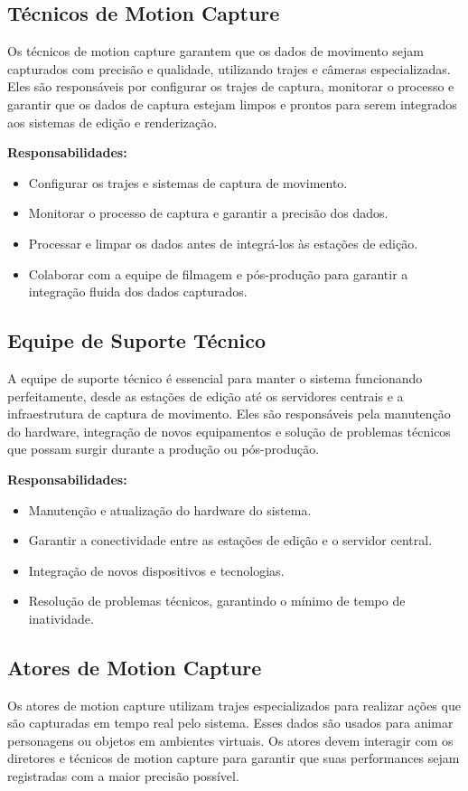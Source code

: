 \subsection{Técnicos de Motion Capture}
Os técnicos de motion capture garantem que os dados de movimento sejam capturados com precisão e qualidade, utilizando trajes e câmeras especializadas. Eles são responsáveis por configurar os trajes de captura, monitorar o processo e garantir que os dados de captura estejam limpos e prontos para serem integrados aos sistemas de edição e renderização.

\textbf{Responsabilidades:}
\begin{itemize}
  \item Configurar os trajes e sistemas de captura de movimento.
  \item Monitorar o processo de captura e garantir a precisão dos dados.
  \item Processar e limpar os dados antes de integrá-los às estações de edição.
  \item Colaborar com a equipe de filmagem e pós-produção para garantir a integração fluida dos dados capturados.
\end{itemize}

\subsection{Equipe de Suporte Técnico}
A equipe de suporte técnico é essencial para manter o sistema funcionando perfeitamente, desde as estações de edição até os servidores centrais e a infraestrutura de captura de movimento. Eles são responsáveis pela manutenção do hardware, integração de novos equipamentos e solução de problemas técnicos que possam surgir durante a produção ou pós-produção.

\textbf{Responsabilidades:}
\begin{itemize}
  \item Manutenção e atualização do hardware do sistema.
  \item Garantir a conectividade entre as estações de edição e o servidor central.
  \item Integração de novos dispositivos e tecnologias.
  \item Resolução de problemas técnicos, garantindo o mínimo de tempo de inatividade.
\end{itemize}

\subsection{Atores de Motion Capture}
Os atores de motion capture utilizam trajes especializados para realizar ações que são capturadas em tempo real pelo sistema. Esses dados são usados para animar personagens ou objetos em ambientes virtuais. Os atores devem interagir com os diretores e técnicos de motion capture para garantir que suas performances sejam registradas com a maior precisão possível.

